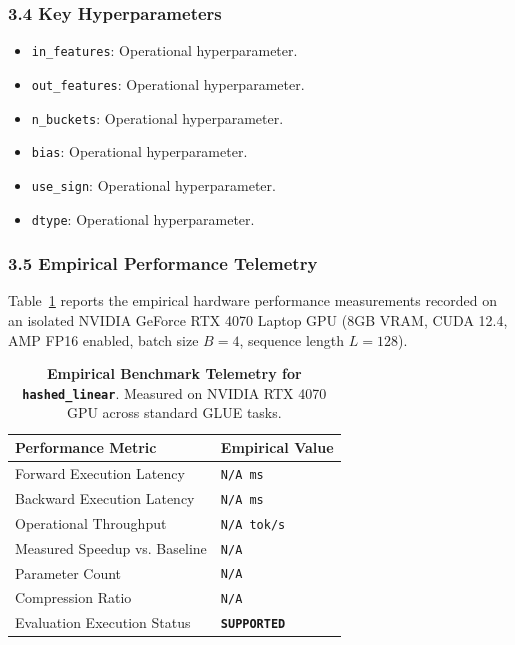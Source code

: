 \subsubsection*{3.4 Key Hyperparameters}
\begin{itemize}
    \item \texttt{in\_features}: Operational hyperparameter.
    \item \texttt{out\_features}: Operational hyperparameter.
    \item \texttt{n\_buckets}: Operational hyperparameter.
    \item \texttt{bias}: Operational hyperparameter.
    \item \texttt{use\_sign}: Operational hyperparameter.
    \item \texttt{dtype}: Operational hyperparameter.
\end{itemize}

\subsubsection*{3.5 Empirical Performance Telemetry}
Table~\ref{tab:telemetry_hashed_linear} reports the empirical hardware performance measurements recorded on an isolated NVIDIA GeForce RTX 4070 Laptop GPU (8GB VRAM, CUDA 12.4, AMP FP16 enabled, batch size $B=4$, sequence length $L=128$).

\begin{table}[h]
\centering
\small
\caption{\textbf{Empirical Benchmark Telemetry for \texttt{hashed\_linear}}. Measured on NVIDIA RTX 4070 GPU across standard GLUE tasks.}
\label{tab:telemetry_hashed_linear}
\begin{tabularx}{\columnwidth}{lX}
\toprule
\textbf{Performance Metric} & \textbf{Empirical Value} \\
\midrule
Forward Execution Latency & \texttt{N/A ms} \\
Backward Execution Latency & \texttt{N/A ms} \\
Operational Throughput & \texttt{N/A tok/s} \\
Measured Speedup vs. Baseline & \texttt{N/A} \\
Parameter Count & \texttt{N/A} \\
Compression Ratio & \texttt{N/A} \\
Evaluation Execution Status & \textbf{\texttt{SUPPORTED}} \\
\bottomrule
\end{tabularx}
\end{table}

